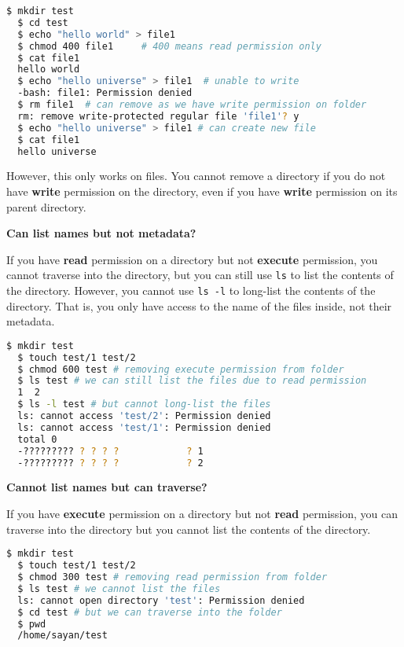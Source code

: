 \begin{lstlisting}[language=bash]
  $ mkdir test
  $ cd test
  $ echo "hello world" > file1
  $ chmod 400 file1     # 400 means read permission only
  $ cat file1
  hello world
  $ echo "hello universe" > file1  # unable to write
  -bash: file1: Permission denied
  $ rm file1  # can remove as we have write permission on folder
  rm: remove write-protected regular file 'file1'? y
  $ echo "hello universe" > file1 # can create new file
  $ cat file1
  hello universe
\end{lstlisting}

However, this only works on files.
You cannot remove a directory if you do not have \textbf{write} permission on the directory, even if you have \textbf{write} permission on its parent directory.

\textbf{Can list names but not metadata?}

If you have \textbf{read} permission on a directory but not \textbf{execute} permission, you cannot traverse into the directory, but you can still use \lstinline|ls| to list the contents of the directory.
However, you cannot use \lstinline|ls -l| to long-list the contents of the directory.
That is, you only have access to the name of the files inside, not their metadata.

\begin{lstlisting}[language=bash]
  $ mkdir test
  $ touch test/1 test/2
  $ chmod 600 test # removing execute permission from folder
  $ ls test # we can still list the files due to read permission
  1  2
  $ ls -l test # but cannot long-list the files
  ls: cannot access 'test/2': Permission denied
  ls: cannot access 'test/1': Permission denied
  total 0
  -????????? ? ? ? ?            ? 1
  -????????? ? ? ? ?            ? 2
\end{lstlisting}

\textbf{Cannot list names but can traverse?}

If you have \textbf{execute} permission on a directory but not \textbf{read} permission, you can traverse into the directory but you cannot list the contents of the directory.

\begin{lstlisting}[language=bash]
  $ mkdir test
  $ touch test/1 test/2
  $ chmod 300 test # removing read permission from folder
  $ ls test # we cannot list the files
  ls: cannot open directory 'test': Permission denied
  $ cd test # but we can traverse into the folder
  $ pwd
  /home/sayan/test
\end{lstlisting}

